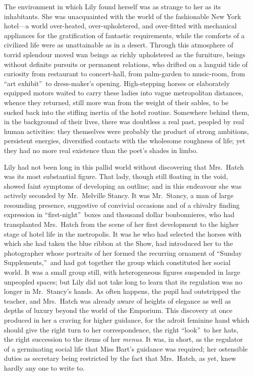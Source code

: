\documentclass[12pt,a4paper]{book}
\begin{document}
The environment in which Lily found herself was as strange to her
as its inhabitants. She was unacquainted with the world of the
fashionable New York hotel---a world over-heated,
over-upholstered, and over-fitted with mechanical appliances for
the gratification of fantastic requirements, while the comforts
of a civilized life were as unattainable as in a desert. Through
this atmosphere of torrid splendour moved wan beings as richly
upholstered as the furniture, beings without definite pursuits or
permanent relations, who drifted on a languid tide of curiosity
from restaurant to concert-hall, from palm-garden to music-room,
from ``art exhibit''\ to dress-maker's opening. High-stepping horses
or elaborately equipped motors waited to carry these ladies into
vague metropolitan distances, whence they returned, still more
wan from the weight of their sables, to be sucked back into the
stifling inertia of the hotel routine. Somewhere behind them, in
the background of their lives, there was doubtless a real past,
peopled by real human activities: they themselves were probably
the product of strong ambitions, persistent energies, diversified
contacts with the wholesome roughness of life; yet they had no
more real existence than the poet's shades in limbo.





Lily had not been long in this pallid world without discovering
that Mrs.\ Hatch was its most substantial figure. That lady,
though still floating in the void, showed faint symptoms of
developing an outline; and in this endeavour she was actively
seconded by Mr.\ Melville Stancy. It was Mr.\ Stancy, a man of
large resounding presence, suggestive of convivial occasions and
of a chivalry finding expression in ``first-night''\ boxes and
thousand dollar bonbonnieres, who had transplanted Mrs.\ Hatch
from the scene of her first development to the higher stage of
hotel life in the metropolis. It was he who had selected the
horses with which she had taken the blue ribbon at the Show, had
introduced her to the photographer whose portraits of her formed
the recurring ornament of ``Sunday Supplements,''\ and had got
together the group which constituted her social world. It was a
small group still, with heterogeneous figures suspended
in large unpeopled spaces; but Lily did not take long to learn
that its regulation was no longer in Mr.\ Stancy's hands. As often
happens, the pupil had outstripped the teacher, and Mrs.\ Hatch
was already aware of heights of elegance as well as depths of
luxury beyond the world of the Emporium. This discovery at once
produced in her a craving for higher guidance, for the adroit
feminine hand which should give the right turn to her
correspondence, the right ``look''\ to her hats, the right
succession to the items of her \textit{menus}. It was, in short, as the
regulator of a germinating social life that Miss Bart's guidance
was required; her ostensible duties as secretary being restricted
by the fact that Mrs.\ Hatch, as yet, knew hardly any one to write
to.
\end{document}
